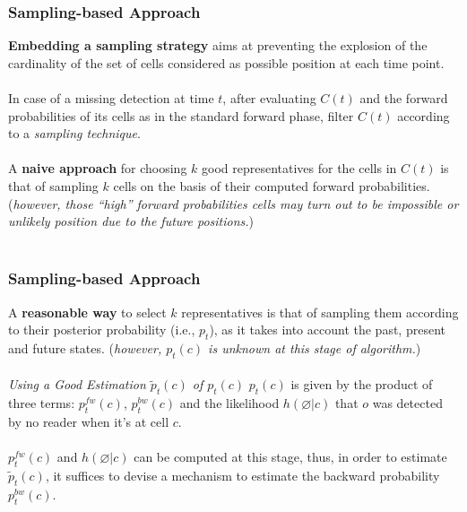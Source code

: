 \begin{frame}
\frametitle{Sampling-based Approach}

\textbf{Embedding a sampling strategy} aims at preventing the explosion of the cardinality of the set of cells considered as possible position at each time point.\\~\\

In case of a missing detection at time $t$, after evaluating $C(t)$ and the forward probabilities of its cells as in the standard forward phase, filter $C(t)$ according to a \emph{sampling technique}.\\~\\

A \textbf{naive approach} for choosing $k$ good representatives for the cells in $C(t)$ is that of sampling $k$ cells on the basis of their computed forward probabilities. (\textit{however, those ``high'' forward probabilities cells may turn out to be impossible or unlikely position due to the future positions.})\\~\\

\end{frame}


\begin{frame}
\frametitle{Sampling-based Approach}

A \textbf{reasonable way} to select $k$ representatives is that of sampling them according to their posterior probability (i.e., $p_t$), as it takes into account the past, present and future states. (\textit{however, $p_t(c)$ is unknown at this stage of algorithm.})\\~\\

\emph{Using a Good Estimation $\widetilde{p}_t(c)$ of $p_t(c)$} \quad $p_t(c)$ is given by the product of three terms: $p_t^{fw}(c)$, $p_t^{bw}(c)$ and the likelihood $h(\varnothing|c)$ that $o$ was detected by no reader when it's at cell $c$.\\~\\

$p_t^{fw}(c)$ and $h(\varnothing|c)$ can be computed at this stage, thus, in order to estimate $\widetilde{p}_t(c)$, it suffices to devise a mechanism to estimate the backward probability $p_t^{bw}(c)$.

\end{frame}

